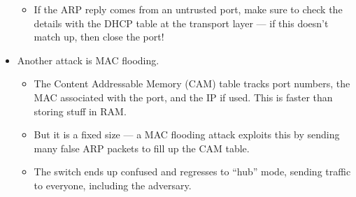 \documentclass{article}
\begin{document}
\begin{itemize}
\begin{itemize}
            \item If the ARP reply comes from an untrusted port, make sure to check the details with the DHCP table at the transport layer --- if this doesn't match up, then close the port!
        \end{itemize}
    \item Another attack is MAC flooding.
        \begin{itemize}
            \item The Content Addressable Memory (CAM) table tracks port numbers, the MAC associated with the port, and the IP if used.  This is faster than storing stuff in RAM.
            \item But it is a fixed size --- a MAC flooding attack exploits this by sending many false ARP packets to fill up the CAM table.
            \item The switch ends up confused and regresses to ``hub'' mode, sending traffic to everyone, including the adversary.
        \end{itemize}
\end{itemize}
\end{document}
